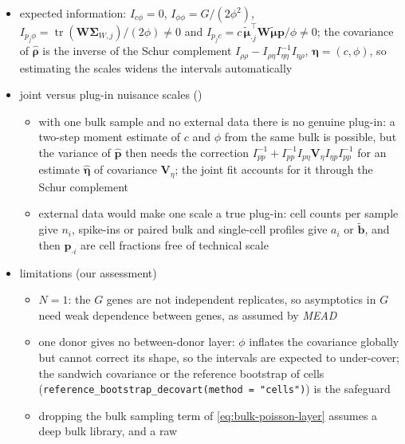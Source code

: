 \begin{itemize}
  \item expected information: \(I_{c\phi}=0\), \(I_{\phi\phi}=G/(2\phi^{2})\),
        \(I_{p_{j}\phi}=\operatorname{tr}(\boldsymbol{W}\boldsymbol{\Sigma}_{W,j})/(2\phi)\neq0\) and
        \(I_{p_{j}c}=c\,\tilde{\boldsymbol{\mu}}_{\cdot j}^{\top}\boldsymbol{W}\tilde{\boldsymbol{\mu}}\boldsymbol{p}/\phi\neq0\); the covariance
        of \(\hat{\boldsymbol{\rho}}\) is the inverse of the Schur complement
        \(I_{\rho\rho}-I_{\rho\eta}I_{\eta\eta}^{-1}I_{\eta\rho}\), \(\boldsymbol{\eta}=(c,\phi)\), so estimating the scales
        widens the intervals automatically
  \item joint versus plug-in nuisance scales
        ()
  \begin{itemize}
    \item with one bulk sample and no external data there is no genuine plug-in: a two-step moment
          estimate of \(c\) and \(\phi\) from the same bulk is possible, but the variance of
          \(\hat{\boldsymbol{p}}\) then needs the correction
          \(I_{pp}^{-1}+I_{pp}^{-1}I_{p\eta}\boldsymbol{V}_{\eta}I_{\eta p}I_{pp}^{-1}\) for an estimate
          \(\hat{\boldsymbol{\eta}}\) of covariance \(\boldsymbol{V}_{\eta}\); the joint fit accounts for it through the
          Schur complement
    \item external data would make one scale a true plug-in: cell counts per sample give \(n_{i}\), spike-ins
          or paired bulk and single-cell profiles give \(a_{i}\) or \(\tilde{\boldsymbol{b}}\), and then
          \(\boldsymbol{p}_{\cdot i}\) are cell fractions free of technical scale
  \end{itemize}
  \item limitations (our assessment)
  \begin{itemize}
    \item \(N=1\): the \(G\) genes are not independent replicates, so asymptotics in \(G\) need weak
          dependence between genes, as assumed by \emph{MEAD} \cite{xieStatisticalInferenceCell2026}
    \item one donor gives no between-donor layer: \(\phi\) inflates the covariance globally but cannot correct
          its shape, so the intervals are expected to under-cover; the sandwich covariance or the reference
          bootstrap of cells (\texttt{reference\_bootstrap\_decovart(method = "cells")}) is the safeguard
    \item dropping the bulk sampling term of \eqref{eq:bulk-poisson-layer} assumes a deep bulk library, and a raw

\end{itemize}
\end{itemize}
